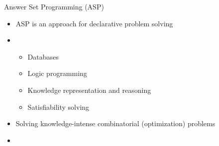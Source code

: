 \begin{frame}{Answer Set Programming (ASP)}
  \begin{itemize}
  \item<1->   

    ASP is an approach for declarative problem solving
  \item <only@2-3> 
      \begin{itemize}
      \item <only@2->  Databases
      \item <only@2->  Logic programming
      \item <only@2->  Knowledge representation and reasoning
      \item <only@2->  Satisfiability solving
      \end{itemize}%
  \item<only@4-> 

    Solving knowledge-intense combinatorial (optimization) problems
  \item<only@5-> 


\end{itemize}
\end{frame}
